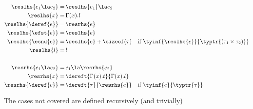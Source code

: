 \begin{align*}
\reslhs{e_1 \la e_2} =&\, \reslhs{e_1} \la e_2\\
\reslhs{x} =&\, \Gamma(x).l \\
\reslhs{\deref{e}} =&\, \resrhs{e} \\
\reslhs{\efst{e}} =&\, \reslhs{e} \\
\reslhs{\esnd{e}} =&\, \reslhs{e} + \sizeof(\tau) \quad \text{if } \tyinf{\reslhs{e}}{\typtr{(\tau_1 \times \tau_2)}}\\
\reslhs{l} =&\, l\\
\\
\resrhs{e_1 \la e_2} =&\, e_1 \la \resrhs{e_2}\\
\resrhs{x} =&\, \dereft{\Gamma(x).t}{\Gamma(x).l} \\
\resrhs{\deref{e}} =&\, \dereft{\tau}{\resrhs{e}} \quad \text{if } \tyinf{e}{\typtr{\tau}}
\end{align*}

The cases not covered are defined recursively (and trivially)

